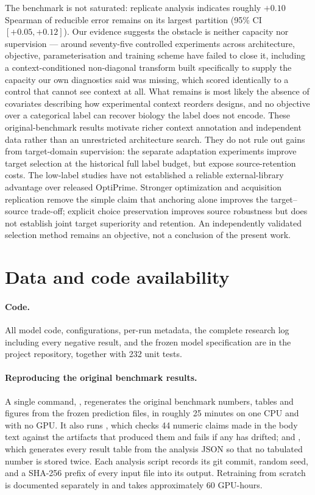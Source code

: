 \documentclass[11pt]{article}
\begin{document}
The benchmark is not saturated: replicate analysis indicates roughly $+0.10$ Spearman of
reducible error remains on its largest partition (95\% CI $[+0.05,+0.12]$). Our evidence
suggests the obstacle is neither capacity nor supervision --- around seventy-five
controlled experiments across architecture, objective, parameterisation and training
scheme have failed to close it, including a context-conditioned non-diagonal transform
built specifically to supply the capacity our own diagnostics said was missing, which
scored identically to a control that cannot see context at all. What remains is most
likely the absence of covariates describing how experimental context reorders designs,
and no objective over a categorical label can recover biology the label does not encode.
These original-benchmark results motivate richer context annotation and independent
data rather than an unrestricted architecture search. They do not rule out gains
from target-domain supervision: the separate adaptation experiments improve target
selection at the historical full label budget, but expose source-retention costs.
The low-label studies have not established a reliable external-library advantage
over released OptiPrime. Stronger optimization and acquisition replication remove
the simple claim that anchoring alone improves the target--source trade-off;
explicit choice preservation improves source robustness but does not establish
joint target superiority and retention. An independently validated
selection method remains an objective, not a conclusion of the present work.

\section*{Data and code availability}

\paragraph{Code.} All model code, configurations, per-run metadata, the complete research
log including every negative result, and the frozen model specification are in the
project repository, together with 232 unit tests.

\paragraph{Reproducing the original benchmark results.} A single command,
, regenerates the original benchmark numbers, tables and figures
from the frozen prediction files, in roughly 25 minutes on one CPU and with no GPU. It
also runs , which checks 44 numeric claims made in
the body text against the artifacts that produced them and fails if any has drifted; and
, which generates every result table from the
analysis JSON so that no tabulated number is stored twice. Each analysis script records
its git commit, random seed, and a SHA-256 prefix of every input file into its output.
Retraining from scratch is documented separately in  and takes
approximately 60 GPU-hours.
\end{document}
